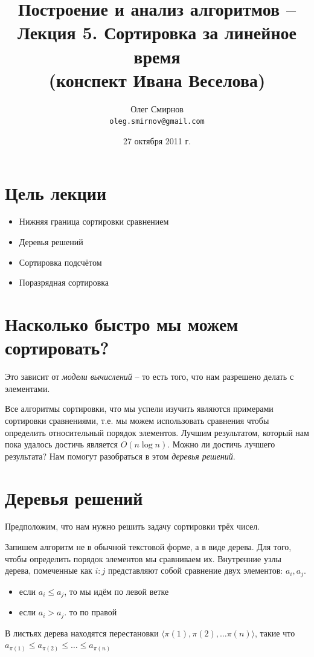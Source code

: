 \documentclass[a4paper,11pt]{article}
\author{Олег Смирнов\\
\texttt{oleg.smirnov@gmail.com}}
\date{27 октября 2011 г.}
\title{Построение и анализ алгоритмов -- Лекция 5. Сортировка за линейное время
\\(конспект Ивана Веселова)}
\begin{document}
\maketitle
\tableofcontents
\newpage

\setlength{\parskip}{1ex plus 0.5ex minus 0.2ex}

\section*{Цель лекции}
\begin{itemize}
\item Нижняя граница сортировки сравнением
\item Деревья решений
\item Сортировка подсчётом
\item Поразрядная сортировка
\end{itemize}

\section{Насколько быстро мы можем сортировать?}
Это зависит от \emph{модели вычислений} -- то есть того, что нам разрешено
делать с элементами.

Все алгоритмы сортировки, что мы успели изучить являются примерами сортировки
сравнениями, т.е. мы можем использовать сравнения чтобы определить относительный
порядок элементов. Лучшим результатом, который нам пока удалось достичь является
$O(n \log n)$. Можно ли достичь лучшего результата? Нам помогут разобраться в
этом \emph{деревья решений}.

\section{Деревья решений}

Предположим, что нам нужно решить задачу сортировки трёх чисел.

Запишем алгоритм не в обычной текстовой форме, а в виде дерева. Для того, чтобы
определить порядок элементов мы сравниваем их. Внутренние узлы дерева,
помеченные как $i:j$ представляют собой сравнение двух элементов: $a_i, a_j$.
\begin{itemize}
\item если $a_i \leqslant a_j$, то мы идём по левой ветке
\item если $a_i > a_j$. то по правой
\end{itemize}

В листьях дерева находятся перестановки $\langle \pi(1), \pi(2), \ldots \pi(n)
\rangle $, такие что $a_{\pi(1)} \leqslant a_{\pi(2)} \leqslant \ldots \leqslant a_{\pi(n)}$
\end{document}
